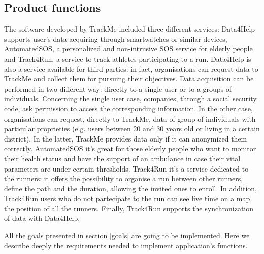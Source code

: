 \documentclass{article}
\begin{document}
\subsection{Product functions}
The software developed by TrackMe included three different services: Data4Help supports user's data acquiring through smartwatches or similar devices, AutomatedSOS, a personalized and 
non-intrusive SOS service for elderly people and Track4Run, a service to track athletes participating to a run.
Data4Help is also a service available for third-parties: in fact, organisations can request data to TrackMe and collect them for pursuing their objectives.
Data acquisition can be performed in two different way: directly to a single user or to a groups of individuals.
Concerning the single user case, companies, through a social security code, ask permission to access the corresponding information. 
In the other case, organisations can request, directly to TrackMe, data of group of individuals with particular proprieties (e.g. users between 20 and 30 years old or living in a certain district).
In the latter, TrackMe provides data only if it can anonymized them correctly.
AutomatedSOS it’s great for those elderly people who want to monitor their health status and have the support of an ambulance in case their vital parameters are under certain thresholds.
Track4Run it’s a service dedicated to the runners: it offers the possibility to organise a run between other runners, define the path and the duration, allowing the invited ones to enroll. In addition, Track4Run users who do not partecipate to the run can see live time on a map the position of all the runners. 
Finally, Track4Run supports the synchronization of data with Data4Help.

All the goals presented in section \ref{goals} are going to be implemented. Here we describe deeply the requirements needed to implement application's functions.
	
\end{document}
